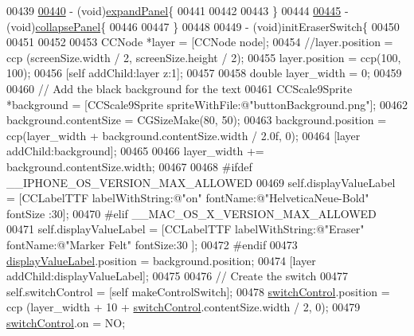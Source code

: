\begin{DoxyCode}
{{{00439 \textcolor{preprocessor}{}
\hypertarget{_controls_layer_8mm_source_l00440}{}\hyperlink{interface_controls_layer_a9891f37671f87b622eb28a252e2e5190}{00440} - (void)\hyperlink{interface_controls_layer_a9891f37671f87b622eb28a252e2e5190}{expandPanel}\{
00441     
00442     
00443 \}
00444 
\hypertarget{_controls_layer_8mm_source_l00445}{}\hyperlink{interface_controls_layer_afddcb3b6b63d05a784b18cb129ec5643}{00445} - (void)\hyperlink{interface_controls_layer_afddcb3b6b63d05a784b18cb129ec5643}{collapsePanel}\{
00446     
00447 \}
00448 
00449 - (void)initEraserSwitch\{
00450     
00451 
00452     
00453     CCNode *layer               = [CCNode node];
00454     \textcolor{comment}{//layer.position              = ccp (screenSize.width / 2, screenSize.height / 2);}
00455     layer.position = ccp(100, 100);
00456     [\textcolor{keyword}{self} addChild:layer z:1];
00457     
00458     \textcolor{keywordtype}{double} layer\_width = 0;
00459     
00460     \textcolor{comment}{// Add the black background for the text}
00461     CCScale9Sprite *background  = [CCScale9Sprite spriteWithFile:@"buttonBackground.png"];
00462     background.contentSize      = CGSizeMake(80, 50);
00463     background.position         = ccp(layer\_width + background.contentSize.width / 2.0f, 0);
00464     [layer addChild:background];
00465     
00466     layer\_width += background.contentSize.width;
00467     
00468 \textcolor{preprocessor}{#ifdef \_\_IPHONE\_OS\_VERSION\_MAX\_ALLOWED}
00469 \textcolor{preprocessor}{}    \textcolor{keyword}{self}.displayValueLabel      = [CCLabelTTF labelWithString:@"on" fontName:@"HelveticaNeue-Bold" fontSize
      :30];
00470 \textcolor{preprocessor}{#elif \_\_MAC\_OS\_X\_VERSION\_MAX\_ALLOWED}
00471 \textcolor{preprocessor}{}    \textcolor{keyword}{self}.displayValueLabel      = [CCLabelTTF labelWithString:@"Eraser" fontName:@"Marker Felt" fontSize:30
      ];
00472 \textcolor{preprocessor}{#endif}
00473 \textcolor{preprocessor}{}    \hyperlink{interface_controls_layer_ab9f12f7a90a0bf6ae1abaeb4d4c4e378}{displayValueLabel}.position  = background.position;
00474     [layer addChild:displayValueLabel];
00475     
00476     \textcolor{comment}{// Create the switch}
00477     \textcolor{keyword}{self}.switchControl          = [\textcolor{keyword}{self} makeControlSwitch];
00478     \hyperlink{interface_controls_layer_a8997cfae8a4f6bcfb8c53d8cab6bb480}{switchControl}.position      = ccp (layer\_width + 10 + 
      \hyperlink{interface_controls_layer_a8997cfae8a4f6bcfb8c53d8cab6bb480}{switchControl}.contentSize.width / 2, 0);
00479     \hyperlink{interface_controls_layer_a8997cfae8a4f6bcfb8c53d8cab6bb480}{switchControl}.on            = NO;
}}}
\end{DoxyCode}
